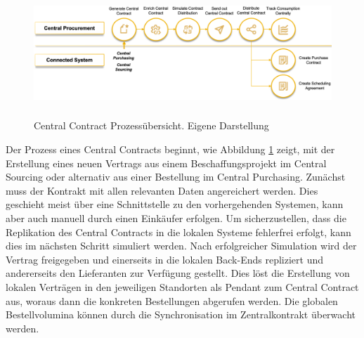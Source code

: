 \begin{figure}[H]
    \centering
    \includegraphics[height=4.76cm]{Bilder/Central_Contract_Process3.png}
    \caption[Central Contract Prozessübersicht]{Central Contract Prozessübersicht. Eigene Darstellung}
    \label{fig:Central_Contract_Process3}
\end{figure}

Der Prozess eines Central Contracts beginnt, wie Abbildung \ref{fig:Central_Contract_Process3} zeigt, mit der Erstellung eines neuen Vertrags aus einem Beschaffungsprojekt im Central Sourcing oder alternativ aus einer Bestellung im Central Purchasing. Zunächst muss der Kontrakt mit allen relevanten Daten angereichert werden. Dies geschieht meist über eine Schnittstelle zu den vorhergehenden Systemen, kann aber auch manuell durch einen Einkäufer erfolgen. Um sicherzustellen, dass die Replikation des Central Contracts in die lokalen Systeme fehlerfrei erfolgt, kann dies im nächsten Schritt simuliert werden. Nach erfolgreicher Simulation wird der Vertrag freigegeben und einerseits in die lokalen Back-Ends repliziert und andererseits den Lieferanten zur Verfügung gestellt. Dies löst die Erstellung von lokalen Verträgen in den jeweiligen Standorten als Pendant zum Central Contract aus, woraus dann die konkreten Bestellungen abgerufen werden. Die globalen Bestellvolumina können durch die Synchronisation im Zentralkontrakt überwacht werden.

